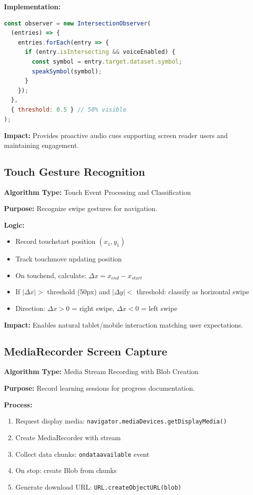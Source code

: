 \documentclass[11pt, a4paper]{article}
\begin{document}
\textbf{Implementation:}
\begin{lstlisting}[language=JavaScript]
const observer = new IntersectionObserver(
  (entries) => {
    entries.forEach(entry => {
      if (entry.isIntersecting && voiceEnabled) {
        const symbol = entry.target.dataset.symbol;
        speakSymbol(symbol);
      }
    });
  },
  { threshold: 0.5 } // 50% visible
);
\end{lstlisting}

\textbf{Impact:} Provides proactive audio cues supporting screen reader users and maintaining engagement.

\subsection{Touch Gesture Recognition}

\textbf{Algorithm Type:} Touch Event Processing and Classification

\textbf{Purpose:} Recognize swipe gestures for navigation.

\textbf{Logic:}
\begin{itemize}[leftmargin=*, noitemsep]
    \item Record touchstart position $(x_1, y_1)$
    \item Track touchmove updating position
    \item On touchend, calculate: $\Delta x = x_{end} - x_{start}$
    \item If $|\Delta x| >$ threshold (50px) and $|\Delta y| < $ threshold: classify as horizontal swipe
    \item Direction: $\Delta x > 0$ = right swipe, $\Delta x < 0$ = left swipe
\end{itemize}

\textbf{Impact:} Enables natural tablet/mobile interaction matching user expectations.

\subsection{MediaRecorder Screen Capture}

\textbf{Algorithm Type:} Media Stream Recording with Blob Creation

\textbf{Purpose:} Record learning sessions for progress documentation.

\textbf{Process:}
\begin{enumerate}[leftmargin=*, noitemsep]
    \item Request display media: \texttt{navigator.mediaDevices.getDisplayMedia()}
    \item Create MediaRecorder with stream
    \item Collect data chunks: \texttt{ondataavailable} event
    \item On stop: create Blob from chunks
    \item Generate download URL: \texttt{URL.createObjectURL(blob)}
\end{enumerate}
\end{document}
